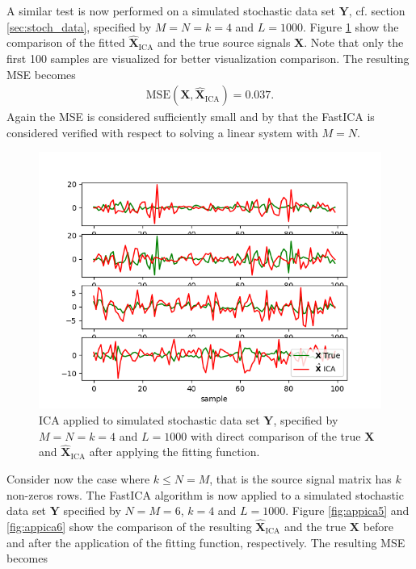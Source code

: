 \noindent
A similar test is now performed on a simulated stochastic data set $\mathbf{Y}$, cf. section \ref{sec:stoch_data}, specified by $M = N = k = 4$ and $L = 1000$. 
Figure \ref{fig:appica3} show the comparison of the fitted $\hat{\mathbf{X}}_{\text{ICA}}$ and the true source signals $\mathbf{X}$. 
Note that only the first 100 samples are visualized for better visualization comparison. The resulting MSE becomes
\begin{align*}
\text{MSE}(\mathbf{X}, \hat{\mathbf{X}}_{\text{ICA}}) = 0.037.
\end{align*}       
Again the MSE is considered sufficiently small and by that the FastICA is considered verified with respect to solving a linear system with $M = N$. 
\begin{figure}[H]
	\centering
	\includegraphics[scale=0.5]{figures/ICAapp/ICA_app3.png}
	\caption{ICA applied to simulated stochastic data set $\mathbf{Y}$, specified by $M = N = k = 4$ and $L = 1000$ with direct comparison of the true $\mathbf{X}$ and $\hat{\mathbf{X}}_{\text{ICA}}$ after applying the fitting function.}
	\label{fig:appica3}
\end{figure}
\noindent
Consider now the case where $k \leq N = M$, that is the source signal matrix has $k$ non-zeros rows. 
The FastICA algorithm is now applied to a simulated stochastic data set $\mathbf{Y} $ specified by $N = M = 6$, $k = 4$ and $L = 1000$. 
Figure \ref{fig:appica5} and \ref{fig:appica6} show the comparison of the resulting $\hat{\mathbf{X}}_{\text{ICA}}$ and the true $\mathbf{X}$ before and after the application of the fitting function, respectively. The resulting MSE becomes
